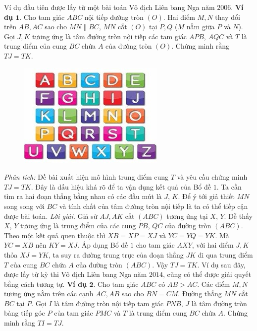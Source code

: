 \begin{multicols}{2}
	Ví dụ đầu tiên được lấy từ một bài toán Vô địch Liên bang Nga năm $2006$.
	\vskip 0.1cm
	\textbf{\color{diendantoanhoc}Ví dụ $\pmb{1.}$} Cho tam giác $ABC$ nội tiếp đường tròn $(O)$. Hai điểm $M,N$ thay đổi trên $AB,AC$ sao cho $MN \parallel BC$, $MN$ cắt $(O)$ tại  $P,Q$ ($M$ nằm giữa $P$ và $N$). Gọi $J,K$ tương ứng là tâm đường tròn nội tiếp các tam giác $APB$, $AQC$ và $T$ là trung điểm của cung $BC$ chứa $A$ của đường tròn $(O)$. Chứng minh rằng $TJ=TK$.
	\begin{figure}[H]
		\vspace*{-5pt}
		\centering
		\captionsetup{labelformat= empty, justification=centering}
		\includegraphics[width= 0.9\linewidth]{4}
		\vspace*{-10pt}
	\end{figure}
	\textit{Phân tích:} Đề bài xuất hiện mô hình trung điểm cung $T$ và yêu cầu chứng minh $TJ=TK$. Đây là dấu hiệu khá rõ để ta vận dụng kết quả của Bổ đề $1$. Ta cần tìm ra hai đoạn thẳng bằng nhau có các đầu mút là $J$, $K$. Để ý tới giả thiết $MN$ song song với $BC$ và tính chất của tâm đường tròn nội tiếp là ta có thể tiếp cận được bài toán.
	\vskip 0.1cm
	\textit{Lời giải.} Giả sử $AJ,AK$ cắt $(ABC)$ tương ứng tại $X$, $Y$. Dễ thấy $X$, $Y$ tương ứng là trung điểm của các cung $PB$, $QC$ của đường tròn $(ABC)$. Theo một kết quả quen thuộc thì $XB=XP=XJ$ và  $YC=YQ=YK$. Mà $YC=XB$ nên $KY=XJ$. Áp dụng Bổ đề $1$ cho tam giác $AXY$, với hai điểm $J,K$ thỏa $XJ=YK$, ta suy ra đường trung trực của đoạn thẳng $JK$ đi qua trung điểm $T$ của cung $BC$ chứa $A$ của đường tròn $(ABC)$. Vậy $TJ=TK$.
	\vskip 0.1cm
	Ví dụ sau đây, được lấy từ kỳ thi Vô địch Liên bang Nga năm $2014$, cũng có thể được giải quyết bằng cách tương tự.
	\vskip 0.1cm
	\textbf{\color{diendantoanhoc}Ví dụ $\pmb{2.}$} Cho tam giác $ABC$ có $AB > AC$. Các điểm $M,N$ tương ứng nằm trên các cạnh $AC,AB$ sao cho $BN=CM$. Đường thẳng $MN$ cắt $BC$ tại $P$. Gọi $I$ là tâm đường tròn nội tiếp tam giác $PNB$, $J$ là tâm đường tròn bàng tiếp góc $P$ của tam giác $PMC$ và $T$ là trung điểm cung $BC$ chứa $A$. Chứng minh rằng  $TI=TJ$.

\end{multicols}
